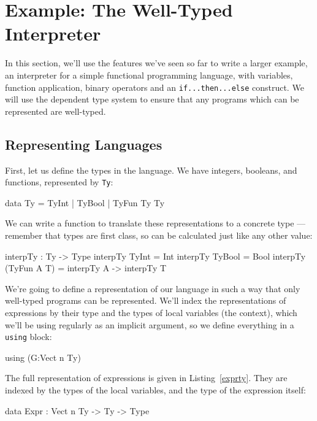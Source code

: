 \section{Example: The Well-Typed Interpreter}
\label{sect:interp}

In this section, we'll use the features we've seen so far to write a larger example, an interpreter for a simple functional programming language, with variables, function application, binary operators and an \texttt{if...then...else} construct.
We will use the dependent type system to ensure that any programs which can be represented are well-typed.

\subsection{Representing Languages}
\label{sect:interp:representation}

First, let us define the types in the language.
We have integers, booleans, and functions, represented by \texttt{Ty}:

\begin{code}
data Ty = TyInt | TyBool | TyFun Ty Ty
\end{code}

\noindent
We can write a function to translate these representations to a concrete \Idris{} type --- remember that types are first class, so can be calculated just like any other value:

\begin{code}
interpTy : Ty -> Type
interpTy TyInt       = Int
interpTy TyBool      = Bool
interpTy (TyFun A T) = interpTy A -> interpTy T
\end{code}

\noindent
We're going to define a representation of our language in such a way that only well-typed programs can be represented.
We'll index the representations of expressions by their type and the types of local variables (the context), which we'll be using regularly as an implicit argument, so we define everything in a \texttt{using} block:

\begin{code}
using (G:Vect n Ty)
\end{code}

\noindent
The full representation of expressions is given in Listing~\ref{exprty}.
They are indexed by the types of the local variables, and the type of the expression itself:

\begin{code}
data Expr : Vect n Ty -> Ty -> Type
\end{code}


